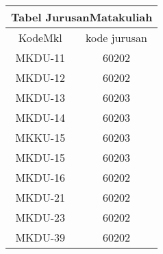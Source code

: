 \documentclass[12pt,a4paper]{article}
\begin{document}
\begin{enumerate}
        \begin{multicols}{3}
          \begin{adjustbox}{scale=0.5,center}
            \begin{tabular}{ |c|c| } 
              \hline
              \multicolumn{2}{|c|}{Tabel JurusanMatakuliah}  \\ \hline
              KodeMkl & kode jurusan \\ \hline \hline
              MKDU-11 & 60202        \\ \hline                                    
              MKDU-12 & 60202        \\ \hline                                    
              MKDU-13 & 60203        \\ \hline                                    
              MKDU-14 & 60203        \\ \hline                                    
              MKKU-15 & 60203        \\ \hline                                    
              MKDU-15 & 60203        \\ \hline                                    
              MKDU-16 & 60202        \\ \hline                                    
              MKDU-21 & 60202        \\ \hline                                    
              MKDU-23 & 60202        \\ \hline                                    
              MKDU-39 & 60202        \\ \hline
            \end{tabular}
          \end{adjustbox}


\end{multicols}
\end{enumerate}
\end{document}

